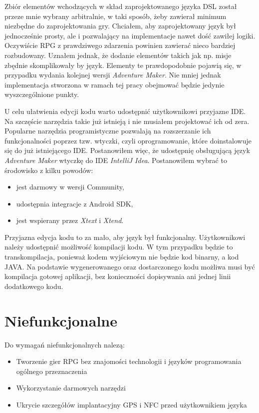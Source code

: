 \documentclass[openright]{xmgr}
\begin{document}
Zbiór elementów wchodzących w skład zaprojektowanego języka DSL został przeze mnie wybrany arbitralnie, w taki sposób, żeby zawierał minimum niezbędne do zaprojektowania gry. Chciałem, aby zaprojektowany język był jednocześnie prosty, ale i pozwalający na implementacje nawet dość zawiłej logiki. Oczywiście RPG z prawdziwego zdarzenia powinien zawierać nieco bardziej rozbudowany. Uznałem jednak, że dodanie elementów takich jak np. misje zbędnie skomplikowały by język. Elementy te prawdopodobnie pojawią się, w przypadku wydania kolejnej wersji \textit{Adventure Maker}. Nie mniej jednak implementacja stworzona w ramach tej pracy obejmować będzie jedynie wyszczególnione punkty.

U celu ułatwienia edycji kodu warto udostępnić użytkownikowi przyjazne IDE. Na szczęście narzędzia takie już istnieją i nie musiałem projektować ich od zera. Popularne narzędzia programistyczne pozwalają na rozszerzanie ich funkcjonalności poprzez tzw. wtyczki, czyli oprogramowanie, które doinstalowuje się do już istniejącego IDE. Postanowiłem więc, że udostępnię obsługującą język \textit{Adventure Maker} wtyczkę do IDE \textit{IntelliJ Idea}. Postanowiłem wybrać to środowisko z kilku powodów:
\begin{itemize}	
\item jest darmowy w wersji Community,
\item udostępnia integracje z Android SDK,
\item jest wspierany przez \textit{Xtext} i \textit{Xtend}.
\end{itemize}

Przyjazna edycja kodu to za mało, aby język był funkcjonalny. Użytkownikowi należy udostępnić możliwość kompilacji kodu. W tym przypadku będzie to transkompilacja, ponieważ kodem wyjściowym nie będzie kod binarny, a kod JAVA. Na podstawie wygenerowanego oraz dostarczonego kodu możliwa musi być kompilacja gotowej aplikacji, bez konieczności dopisywania ani jednej linii dodatkowego kodu. 

\section{Niefunkcjonalne}
Do wymagań niefunkcjonalnych nalezą:
\begin{itemize}
	\item Tworzenie gier RPG bez znajomości technologii i języków programowania ogólnego przeznaczenia
	\item Wykorzystanie darmowych narzędzi
	\item Ukrycie szczegółów implantacyjny GPS i NFC przed użytkownikiem języka
\end{itemize}
\end{document}
